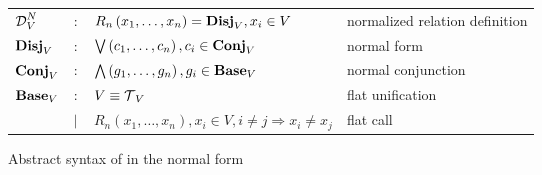\begin{figure*}[t!]
    \begin{tabular}{llll}
        $\operatorname{\mathcal{D}}_{V}^N$ & $:$    & $R_{n}\left( x_1, \ldots, x_{n} \right) = \operatorname{\mathbf{Disj}}_{V}, x_{i}\in V$                        & normalized relation definition \\
        $\operatorname{\mathbf{Disj}}_{V}$  & $:$    & $\bigvee\left( c_1, \ldots, c_{n} \right), c_{i}\in \operatorname{\mathbf{Conj}}_{V}$                          & normal form                    \\
        $\operatorname{\mathbf{Conj}}_{V}$  & $:$    & $\bigwedge\left( g_1, \ldots, g_n \right), g_{i}\in \operatorname{\mathbf{Base}}_{V}$                          & normal conjunction             \\
        $\operatorname{\mathbf{Base}}_{V}$  & $:$    & $V \equiv \operatorname{\mathcal{T}}_{V}$                                                                & flat unification               \\
                     & $\mid$ & $R_{n}\left( x_1, \ldots, x_{n} \right), x_{i}\in V, i \neq j \Rightarrow x_i \neq x_j$ & flat call                      \\

    \end{tabular}
    \caption{Abstract syntax of \mk in the normal form}
    \label{fig:miniKanren}
\end{figure*}
